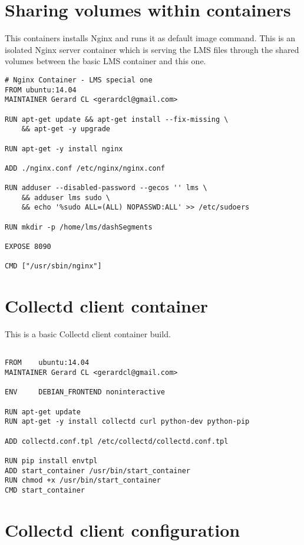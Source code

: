 \section{Sharing volumes within containers}\label{ANX:dockerFiles4}

This containers installs Nginx and runs it as default image command. This is an isolated Nginx server container which is serving the LMS files through the shared volumes between the basic LMS container and this one.

\begin{verbatim}
# Nginx Container - LMS special one
FROM ubuntu:14.04
MAINTAINER Gerard CL <gerardcl@gmail.com>

RUN apt-get update && apt-get install --fix-missing \
	&& apt-get -y upgrade

RUN apt-get -y install nginx 

ADD ./nginx.conf /etc/nginx/nginx.conf

RUN adduser --disabled-password --gecos '' lms \
	&& adduser lms sudo \
	&& echo '%sudo ALL=(ALL) NOPASSWD:ALL' >> /etc/sudoers

RUN mkdir -p /home/lms/dashSegments

EXPOSE 8090

CMD ["/usr/sbin/nginx"]  
\end{verbatim}

\section{Collectd client container}\label{ANX:dockerFiles5}

This is a basic Collectd client container build.

\begin{verbatim}

FROM    ubuntu:14.04
MAINTAINER Gerard CL <gerardcl@gmail.com>

ENV     DEBIAN_FRONTEND noninteractive

RUN apt-get update
RUN apt-get -y install collectd curl python-dev python-pip

ADD collectd.conf.tpl /etc/collectd/collectd.conf.tpl

RUN pip install envtpl
ADD start_container /usr/bin/start_container
RUN chmod +x /usr/bin/start_container
CMD start_container

\end{verbatim}

\section{Collectd client configuration}\label{ANX:collectdFiles1}

